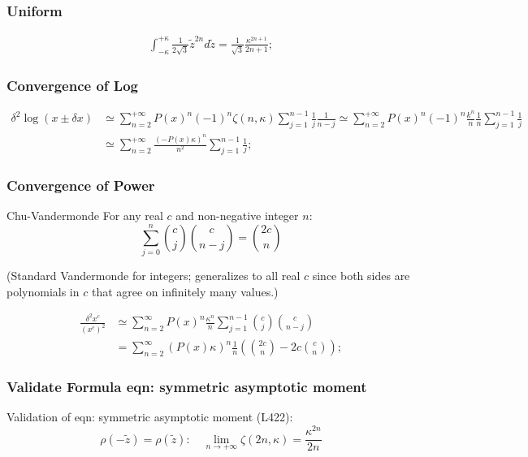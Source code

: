 \documentclass[twoside]{article}
\numberwithin{equation}{section}
\begin{document}
\subsubsection{Uniform}


\begin{align*}
\int_{-\kappa}^{+\kappa} \frac{1}{2 \sqrt{3}} \tilde{z}^{2n} d \tilde{z} = \frac{1}{\sqrt{3}} \frac{\kappa^{2n+1}}{2n + 1};
\end{align*}


\subsubsection{Convergence of Log}


\begin{align*}
\delta^2 \log(x \pm \delta x) &\simeq \sum_{n = 2}^{+\infty} P(x)^{n} (-1)^n \zeta(n, \kappa) \sum_{j=1}^{n-1} \frac{1}{j} \frac{1}{n-j} 
		\simeq \sum_{n = 2}^{+\infty} P(x)^{n} (-1)^n \frac{k^n}{n} \frac{1}{n} \sum_{j=1}^{n-1} \frac{1}{j}  \nonumber \\
	&\simeq \sum_{n = 2}^{+\infty} \frac{(-P(x) \kappa)^{n}}{n^2} \sum_{j=1}^{n-1} \frac{1}{j};
\end{align*}


\subsubsection{Convergence of Power}

Chu-Vandermonde
For any real $c$ and non-negative integer $n$:
$$\sum_{j=0}^{n} \binom{c}{j}\binom{c}{n-j} = \binom{2c}{n}$$

(Standard Vandermonde for integers; generalizes to all real $c$ since both sides are polynomials in $c$ that agree on infinitely many values.)

\begin{align*}
\frac{\delta^2 x^c}{(x^c)^2} &\simeq \sum_{n=2}^{\infty} P(x)^{n} \frac{\kappa^n}{n} 
		\sum_{j=1}^{n - 1} \binom{c}{j} \binom{c}{n - j} \\
	&= \sum_{n=2}^{\infty} (P(x) \kappa)^n \frac{1}{n} \left( \binom{2c}{n} - 2 c \binom{c}{n} \right);
\end{align*}


\subsubsection{Validate Formula {eqn: symmetric asymptotic moment}}

Validation of eqn: symmetric asymptotic moment (L422):
$$\rho(-\tilde z) = \rho(\tilde z):\quad \lim_{n\to+\infty}\zeta(2n,\kappa) = \frac{\kappa^{2n}}{2n}$$
\end{document}
